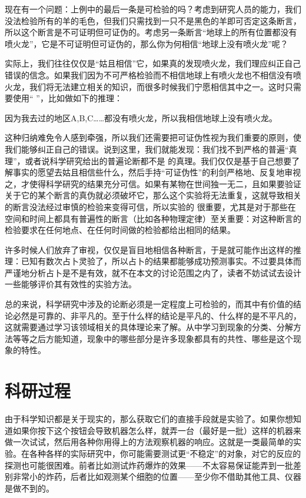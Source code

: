 \documentclass[a4paper,10pt,english]{sphinxmanual}
\begin{document}
现在有一个问题：上例中的最后一条是可检验的吗？考虑到研究人员的能力，我们没法检验所有的羊的毛色，但我们只需找到一只不是黑色的羊即可否定这条断言，所以这个断言是不可证明但可证伪的。考虑另一条断言“地球上的所有位置都没有喷火龙”，它是不可证明但可证伪的，那么你为何相信“地球上没有喷火龙”呢？

实际上，我们往往仅仅是“姑且相信”它，如果真的发现喷火龙，我们理应纠正自己错误的信念。如果我们因为不可严格检验而不相信地球上有喷火龙也不相信没有喷火龙，我们将无法建立相关的知识，而很多时候我们宁愿相信其中之一。这时只需要使用“  ”，比如做如下的推理：

因为我去过的地区A,B,C……都没有喷火龙，所以我相信地球上没有喷火龙。

这种归纳难免令人感到牵强，所以我们还需要把可证伪性视为我们重要的原则，使我们能够纠正自己的错误。说到这里，我们就能发现：我们找不到严格的普遍“真理”，或者说科学研究给出的普遍论断都不是  的真理。我们仅仅是基于自己想要了解事实的愿望去姑且相信些什么，然后手持“可证伪性”的利剑严格地、反复地审视之，才使得科学研究的结果充分可信。如果有某物在世间独一无二，且如果要验证关于它的某个断言的真伪就必须破坏它，那么这个实验将无法重复，这就导致相关的断言没法经过审慎的检验来变得可信，所以实验的  很重要，尤其是对于那些在空间和时间上都具有普遍性的断言（比如各种物理定律）至关重要：对这种断言的检验要求在任何地点、在任何时间做的检验都给出相同的结果。

许多时候人们放弃了审视，仅仅是盲目地相信各种断言，于是就可能作出这样的推理：已知有数次占卜灵验了，所以占卜的结果都能够成功预测事实。不过要具体而严谨地分析占卜是不是有效，就不在本文的讨论范围之内了，读者不妨试试去设计一些能够评价其有效性的实验方法。

总的来说，科学研究中涉及的论断必须是一定程度上可检验的，而其中有价值的结论必然是可靠的、非平凡的。至于什么样的结论是平凡的、什么样的是不平凡的，这就需要通过学习该领域相关的具体理论来了解。从中学习到现象的分类、分解方法等等之后方能知道，现象中的哪些部分是许多现象都具有的共性、哪些是这个现象的特性。


\section{科研过程}
\label{\detokenize{3. Intro_Research:id3}}
由于科学知识都是关于现实的，那么获取它们的直接手段就是实验了。如果你想知道如果你按下这个按钮会导致机器怎么样，就弄一台（最好是一批）这样的机器来做一次试试，然后用各种你用得上的方法观察机器的响应。这就是一类最简单的实验。在各种各样的实际研究中，你可能需要测试更“不稳定”的对象，对它的反应的探测也可能很困难。前者比如测试炸药爆炸的效果——不太容易保证能弄到一批差别非常小的炸药，后者比如观测某个细胞的位置——至少你不借助其他工具、仪器是做不到的。
\end{document}
